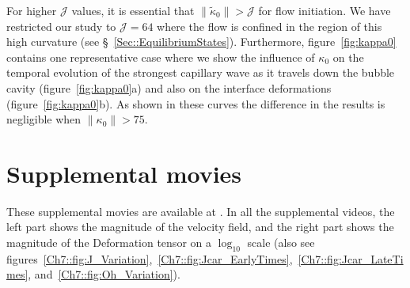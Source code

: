 \begin{subappendices}
For higher $\mathcal{J}$ values, it is essential that $\|\tilde \kappa_0\| > \mathcal{J}$ for flow initiation. We have restricted our study to $\mathcal{J} = 64$ where the flow is confined in the region of this high curvature (see \S~\ref{Sec::EquilibriumStates}). Furthermore, figure~\ref{fig:kappa0} contains one representative case where we show the influence of $\kappa_0$ on the temporal evolution of the strongest capillary wave as it travels down the bubble cavity (figure~\ref{fig:kappa0}a) and also on the interface deformations (figure~\ref{fig:kappa0}b). As shown in these curves the difference in the results is negligible when $\|\kappa_0\| > 75$.

\section{Supplemental movies}\label{Ch7::SupplementalMovies}
These supplemental movies are available at \citet[\href{https://youtube.com/playlist?list=PLf5C5HCrvhLFETl6iaRr21pzr5Xab1OCM}{external YouTube link,}][]{vatsalVPsuppl}. In all the supplemental videos, the left part shows the magnitude of the velocity field, and the right part shows the magnitude of the Deformation tensor on a $\log_{10}$ scale (also see figures~\ref{Ch7::fig:J_Variation},~\ref{Ch7::fig:Jcar_EarlyTimes},~\ref{Ch7::fig:Jcar_LateTimes}, and~\ref{Ch7::fig:Oh_Variation}).


\end{subappendices}
